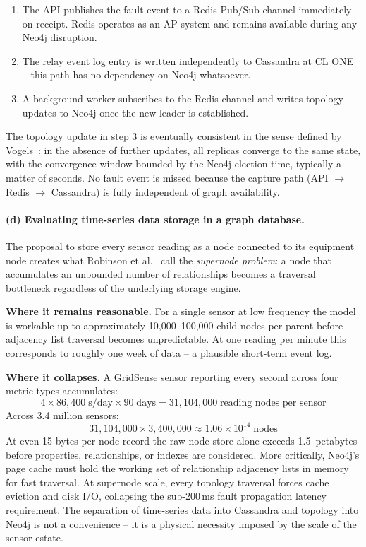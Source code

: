 \documentclass[11pt, a4paper]{article}
\makeatletter
\renewcommand{\_}{\origunderscore\penalty\z@\hskip\z@skip}
\renewcommand{\{}{\origlbrace\penalty\z@\hskip\z@skip}
\renewcommand{\}}{\origrbrace\penalty\z@\hskip\z@skip}
\makeatother
\begin{document}
\begin{enumerate}
  \item The API publishes the fault event to a Redis Pub/Sub channel
    immediately on receipt. Redis operates as an AP system and remains
    available during any Neo4j disruption.
  \item The relay event log entry is written independently to Cassandra
    at CL ONE -- this path has no dependency on Neo4j whatsoever.
  \item A background worker subscribes to the Redis channel and writes
    topology updates to Neo4j once the new leader is established.
\end{enumerate}

The topology update in step 3 is eventually consistent in the sense
defined by Vogels~\cite{vogels2009}: in the absence of further updates,
all replicas converge to the same state, with the convergence window
bounded by the Neo4j election time, typically a matter of seconds. No
fault event is missed because the capture path (API $\to$ Redis $\to$
Cassandra) is fully independent of graph availability.

\paragraph{(d) Evaluating time-series data storage in a graph database.}
The proposal to store every sensor reading as a node connected to its
equipment node creates what Robinson et al.~\cite{robinson2015} call the
\emph{supernode problem}: a node that accumulates an unbounded number of
relationships becomes a traversal bottleneck regardless of the underlying
storage engine.

\textbf{Where it remains reasonable.} For a single sensor at low
frequency the model is workable up to approximately 10,000--100,000
child nodes per parent before adjacency list traversal becomes
unpredictable. At one reading per minute this corresponds to roughly
one week of data -- a plausible short-term event log.

\textbf{Where it collapses.} A GridSense sensor reporting every second
across four metric types accumulates:
\[
  4 \times 86{,}400\;\text{s/day} \times 90\;\text{days}
  = 31{,}104{,}000\;\text{reading nodes per sensor}
\]
Across 3.4 million sensors:
\[
  31{,}104{,}000 \times 3{,}400{,}000 \approx 1.06 \times 10^{14}
  \;\text{nodes}
\]
At even 15 bytes per node record the raw node store alone exceeds
1.5~petabytes before properties, relationships, or indexes are
considered. More critically, Neo4j's page cache must hold the working
set of relationship adjacency lists in memory for fast traversal. At
supernode scale, every topology traversal forces cache eviction and disk
I/O, collapsing the sub-200\,ms fault propagation latency requirement.
The separation of time-series data into Cassandra and topology into
Neo4j is not a convenience -- it is a physical necessity imposed by the
scale of the sensor estate.
\end{document}

